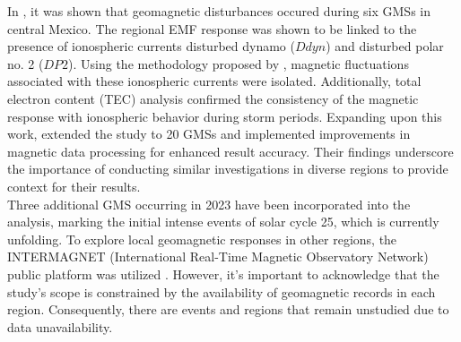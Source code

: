 \documentclass[12pt]{article}
\begin{document}
In \cite{tesis}, it was shown that geomagnetic disturbances occured during six GMSs in central Mexico. The regional EMF response was shown to be linked to the presence of ionospheric currents disturbed dynamo ($Ddyn$) and disturbed polar no. 2 ($DP2$). Using the methodology proposed by \cite{amory2020_filtros}, magnetic fluctuations associated with these ionospheric currents were isolated. Additionally, total electron content (TEC) analysis confirmed the consistency of the magnetic response with ionospheric behavior during storm periods. Expanding upon this work, \cite{CASTELLANOSVELAZCO2024106237} extended the study to 20 GMSs and implemented improvements in magnetic data processing for enhanced result accuracy. Their findings underscore the importance of conducting similar investigations in diverse regions to provide context for their results.\\


Three additional GMS occurring in 2023 have been incorporated into the analysis, marking the initial intense events of solar cycle 25, which is currently unfolding. To explore local geomagnetic responses in other regions, the INTERMAGNET (International Real-Time Magnetic Observatory Network) public platform was utilized \citep{intermagnet}. However, it's important to acknowledge that the study's scope is constrained by the availability of geomagnetic records in each region. Consequently, there are events and regions that remain unstudied due to data unavailability.\\
\end{document}
